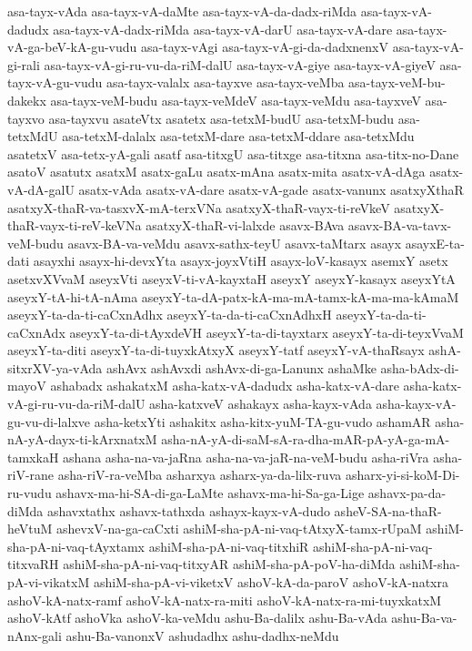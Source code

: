 {asa-tayx-vAda
asa-tayx-vA-daMte
asa-tayx-vA-da-dadx-riMda
asa-tayx-vA-dadudx
asa-tayx-vA-dadx-riMda
asa-tayx-vA-darU
asa-tayx-vA-dare
asa-tayx-vA-ga-beV-kA-gu-vudu
asa-tayx-vAgi
asa-tayx-vA-gi-da-dadxnenxV
asa-tayx-vA-gi-rali
asa-tayx-vA-gi-ru-vu-da-riM-dalU
asa-tayx-vA-giye
asa-tayx-vA-giyeV
asa-tayx-vA-gu-vudu
asa-tayx-valalx
asa-tayxve
asa-tayx-veMba
asa-tayx-veM-bu-dakekx
asa-tayx-veM-budu
asa-tayx-veMdeV
asa-tayx-veMdu
asa-tayxveV
asa-tayxvo
asa-tayxvu
asateVtx
asatetx
asa-tetxM-budU
asa-tetxM-budu
asa-tetxMdU
asa-tetxM-dalalx
asa-tetxM-dare
asa-tetxM-ddare
asa-tetxMdu
asatetxV
asa-tetx-yA-gali
asatf
asa-titxgU
asa-titxge
asa-titxna
asa-titx-no-Dane
asatoV
asatutx
asatxM
asatx-gaLu
asatx-mAna
asatx-mita
asatx-vA-dAga
asatx-vA-dA-galU
asatx-vAda
asatx-vA-dare
asatx-vA-gade
asatx-vanunx
asatxyXthaR
asatxyX-thaR-va-tasxvX-mA-terxVNa
asatxyX-thaR-vayx-ti-reVkeV
asatxyX-thaR-vayx-ti-reV-keVNa
asatxyX-thaR-vi-lalxde
asavx-BAva
asavx-BA-va-tavx-veM-budu
asavx-BA-va-veMdu
asavx-sathx-teyU
asavx-taMtarx
asayx
asayxE-ta-dati
asayxhi
asayx-hi-devxYta
asayx-joyxVtiH
asayx-loV-kasayx
asemxY
asetx
asetxvXVvaM
aseyxVti
aseyxV-ti-vA-kayxtaH
aseyxY
aseyxY-kasayx
aseyxYtA
aseyxY-tA-hi-tA-nAma
aseyxY-ta-dA-patx-kA-ma-mA-tamx-kA-ma-ma-kAmaM
aseyxY-ta-da-ti-caCxnAdhx
aseyxY-ta-da-ti-caCxnAdhxH
aseyxY-ta-da-ti-caCxnAdx
aseyxY-ta-di-tAyxdeVH
aseyxY-ta-di-tayxtarx
aseyxY-ta-di-teyxVvaM
aseyxY-ta-diti
aseyxY-ta-di-tuyxkAtxyX
aseyxY-tatf
aseyxY-vA-thaRsayx
ashA-sitxrXV-ya-vAda
ashAvx
ashAvxdi
ashAvx-di-ga-Lanunx
ashaMke
asha-bAdx-di-mayoV
ashabadx
ashakatxM
asha-katx-vA-dadudx
asha-katx-vA-dare
asha-katx-vA-gi-ru-vu-da-riM-dalU
asha-katxveV
ashakayx
asha-kayx-vAda
asha-kayx-vA-gu-vu-di-lalxve
asha-ketxYti
ashakitx
asha-kitx-yuM-TA-gu-vudo
ashamAR
asha-nA-yA-dayx-ti-kArxnatxM
asha-nA-yA-di-saM-sA-ra-dha-mAR-pA-yA-ga-mA-tamxkaH
ashana
asha-na-va-jaRna
asha-na-va-jaR-na-veM-budu
asha-riVra
asha-riV-rane
asha-riV-ra-veMba
asharxya
asharx-ya-da-lilx-ruva
asharx-yi-si-koM-Di-ru-vudu
ashavx-ma-hi-SA-di-ga-LaMte
ashavx-ma-hi-Sa-ga-Lige
ashavx-pa-da-diMda
ashavxtathx
ashavx-tathxda
ashayx-kayx-vA-dudo
asheV-SA-na-thaR-heVtuM
ashevxV-na-ga-caCxti
ashiM-sha-pA-ni-vaq-tAtxyX-tamx-rUpaM
ashiM-sha-pA-ni-vaq-tAyxtamx
ashiM-sha-pA-ni-vaq-titxhiR
ashiM-sha-pA-ni-vaq-titxvaRH
ashiM-sha-pA-ni-vaq-titxyAR
ashiM-sha-pA-poV-ha-diMda
ashiM-sha-pA-vi-vikatxM
ashiM-sha-pA-vi-viketxV
ashoV-kA-da-paroV
ashoV-kA-natxra
ashoV-kA-natx-ramf
ashoV-kA-natx-ra-miti
ashoV-kA-natx-ra-mi-tuyxkatxM
ashoV-kAtf
ashoVka
ashoV-ka-veMdu
ashu-Ba-dalilx
ashu-Ba-vAda
ashu-Ba-va-nAnx-gali
ashu-Ba-vanonxV
ashudadhx
ashu-dadhx-neMdu
}
